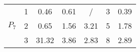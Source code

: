 \documentclass[11pt]{article}
\begin{document}
\begin{table}
\begin{tabular}{cc|c|c|c||c|c|}
\multicolumn{1}{|c|}{\multirow{3}{*}{$P_7$}} & 1 
 & \multicolumn{1}{||c|}{0.46} & 0.61 & / & 3 & 0.39 \\ \cline{2-7} 
\multicolumn{1}{|c|}{} & 2
 & \multicolumn{1}{||c|}{0.65} & 1.56 & 3.21 & 5 & 1.78 \\ \cline{2-7} 
\multicolumn{1}{|c|}{} & 3
 & \multicolumn{1}{||c|}{31.32} & 3.86 & 2.83 & 8 & 2.89 \\ \hline

\end{tabular}
\end{table}
\end{document}

